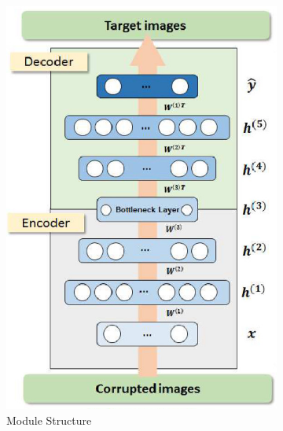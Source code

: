 \documentclass[a4paper, 10pt]{article}
\begin{document}
	\begin{figure}[htbp] 
		\centering 
		
		\begin{subfigure}{0.45\textwidth}
			\includegraphics[width=\linewidth]{picture/LLIE/LLNet/Module Structure}
			\captionsetup{font=scriptsize}
			\caption{Module Structure}
			\label{fig: Module Structure}
		\end{subfigure}
		\begin{subfigure}{0.18\textwidth}

\end{subfigure}
\end{figure}
\end{document}
